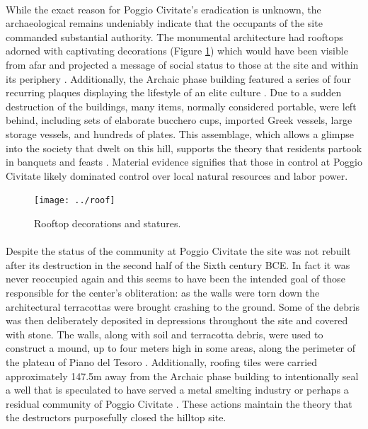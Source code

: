 \documentclass[12pt,a4paper]{thesis}
\begin{document}
\paragraph{}
While the exact reason for Poggio Civitate's eradication is unknown, the archaeological remains undeniably indicate that the occupants of the site commanded substantial authority.  The monumental architecture had rooftops adorned with captivating decorations (Figure \ref{fig:roof}) which would have been visible from afar and projected a message of social status to those at the site and within its periphery \citep{Tuc06,Odo13}. Additionally, the Archaic phase building featured a series of four recurring plaques displaying the lifestyle of an elite culture \cite[159]{Win09}. Due to a sudden destruction of the buildings, many items, normally considered portable, were left behind, including sets of elaborate bucchero cups, imported Greek vessels, large storage vessels, and hundreds of plates. This assemblage, which allows a glimpse into the society that dwelt on this hill, supports the theory that residents partook in banquets and feasts \cite[162-166]{BarRas98}. Material evidence signifies that those in control at Poggio Civitate likely dominated control over local natural resources and labor power. 

\begin{figure}
\centering
\texttt{[image: ../roof]}
\caption{Rooftop decorations and statures.}
\label{fig:roof}
\end{figure}

\paragraph{}
Despite the status of the community at Poggio Civitate the site was not rebuilt after its destruction in the second half of the Sixth century BCE. In fact it was never reoccupied again and this seems to have been the intended goal of those responsible for the center's obliteration: as the walls were torn down the architectural terracottas were brought crashing to the ground. Some of the debris was then deliberately deposited in depressions throughout the site and covered with stone. The walls, along with soil and terracotta debris, were used to construct a mound, up to four meters high in some areas, along the perimeter of the plateau of Piano del Tesoro \citep{IEB94}. Additionally, roofing tiles were carried approximately 147.5m away from the Archaic phase building to intentionally seal a well that is speculated to have served a metal smelting industry or perhaps a residual community of Poggio Civitate \citep{TucBruHunTal10}. These actions maintain the theory that the destructors purposefully closed the hilltop site.
\end{document}
